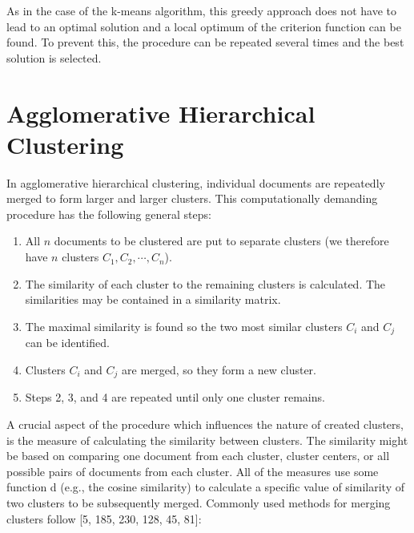 \documentclass[11pt,openany,executivepaper]{book}
\begin{document}
As in the case of the k-means algorithm, this greedy approach does not have to lead to an optimal solution and a local optimum of the criterion function can be found. 
To prevent this, the procedure can be repeated several times and the best solution is selected.

\section{Agglomerative Hierarchical Clustering}

In agglomerative hierarchical clustering, individual documents are repeatedly merged to form larger and larger clusters. 
This computationally demanding procedure has the following general steps:

\begin{enumerate}
    \item All \( n \) documents to be clustered are put to separate clusters (we therefore have \( n \) clusters \( C_1, C_2, \cdots, C_n \)).
    \item The similarity of each cluster to the remaining clusters is calculated. The similarities may be contained in a similarity matrix.
    \item The maximal similarity is found so the two most similar clusters $C_i$ and $C_j$ can be identified.
    \item Clusters $C_i$ and $C_j$ are merged, so they form a new cluster.
    \item Steps 2, 3, and 4 are repeated until only one cluster remains.
\end{enumerate}

A crucial aspect of the procedure which influences the nature of created clusters, is the measure of calculating the similarity between clusters. The similarity might be based on comparing one document from each cluster, cluster centers, or all possible pairs of documents from each cluster. All of the measures use some function d (e.g., the cosine similarity) to calculate a specific value of similarity of
two clusters to be subsequently merged. Commonly used methods for merging
clusters follow [5, 185, 230, 128, 45, 81]:
\end{document}
